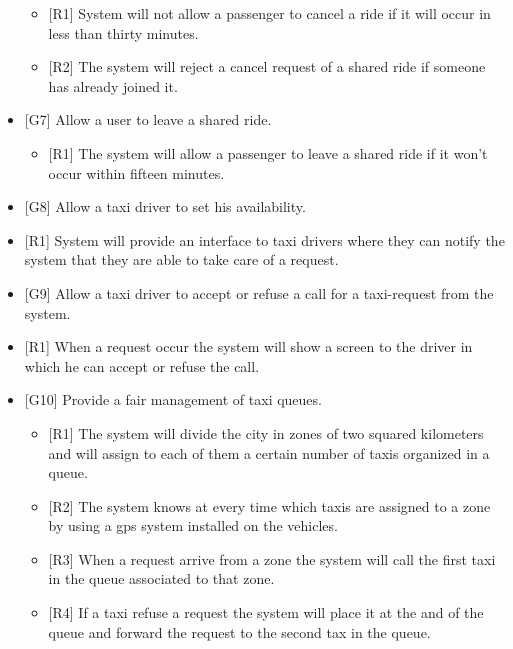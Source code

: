 \begin{itemize}
\begin{itemize}
				\item {[R1]} System will not allow a passenger to cancel a ride if it will occur in less than thirty minutes.
				\item {[R2]} The system will reject a cancel request of a shared ride if someone has already joined it.
			\end{itemize}
		\item {[G7]} Allow a user to leave a shared ride.
			\begin{itemize}
				\item {[R1]} The system will allow a passenger to leave a shared ride if it won't occur within fifteen minutes.
			\end{itemize}
		\item {[G8]} Allow a taxi driver to set his availability.
			\item {[R1]} System will provide an interface to taxi drivers where they can notify the system that they are able to take care of a request.
		\item {[G9]} Allow a taxi driver to accept or refuse a call for a taxi-request from the system.
			\item {[R1]} When a request occur the system will show a screen to the driver in which he can accept or refuse the call.
		\item {[G10]} Provide a fair management of taxi queues.
			\begin{itemize}
				\item {[R1]} The system will divide the city in zones of two squared kilometers and will assign to each of them a certain number of taxis organized in a queue.
				\item {[R2]} The system knows at every time which taxis are assigned to a zone by using a gps system installed on the vehicles.
				\item {[R3]} When a request arrive from a zone the system will call the first taxi in the queue associated to that zone.
				\item {[R4]} If a taxi refuse a request the system will place it at the and of the queue and forward the request to the second tax in the queue.
			\end{itemize}
		\end{itemize}